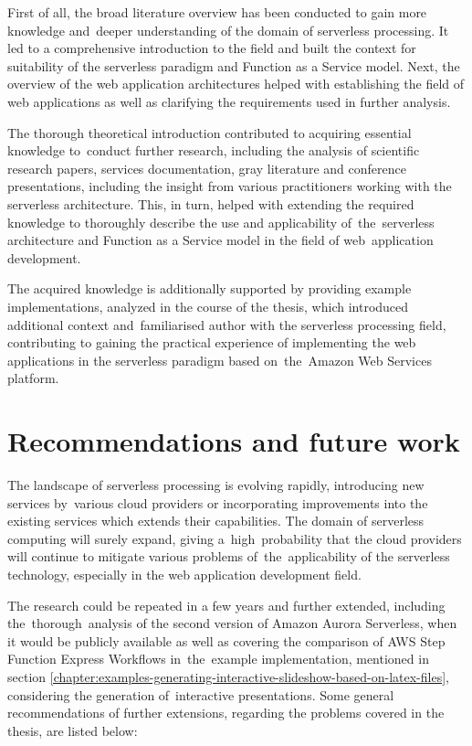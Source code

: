 First of all, the broad literature overview has been conducted to gain more knowledge and~deeper understanding of the domain of serverless processing.
It led to a comprehensive introduction to the field and built the context for suitability of the serverless paradigm and Function as a Service model.
Next, the overview of the web application architectures helped with establishing the field of web applications as well as clarifying the requirements used in further analysis.

The thorough theoretical introduction contributed to acquiring essential knowledge to~conduct further research, including the analysis of scientific research papers, services documentation, gray literature and conference presentations, including the insight from various practitioners working with the serverless architecture.
This, in turn, helped with extending the required knowledge to thoroughly describe the use and applicability of~the~serverless architecture and Function as a Service model in the field of web~application development.

The acquired knowledge is additionally supported by providing example implementations, analyzed in the course of the thesis, which introduced additional context and~familiarised author with the serverless processing field, contributing to gaining the practical experience of implementing the web applications in the serverless paradigm based on~the~Amazon Web Services platform.

\section{Recommendations and future work}

The landscape of serverless processing is evolving rapidly, introducing new services by~various cloud providers or incorporating improvements into the existing services which extends their capabilities.
The domain of serverless computing will surely expand, giving a~high~probability that the cloud providers will continue to mitigate various problems of~the~applicability of the serverless technology, especially in the web application development field.

The research could be repeated in a few years and further extended, including the~thorough~analysis of the second version of Amazon Aurora Serverless, when it would be publicly available as well as covering the comparison of AWS Step Function Express Workflows in~the~example implementation, mentioned in section \ref{chapter:examples-generating-interactive-slideshow-based-on-latex-files}, considering the generation of~interactive presentations.
Some general recommendations of further extensions, regarding the problems covered in the thesis, are listed below:

